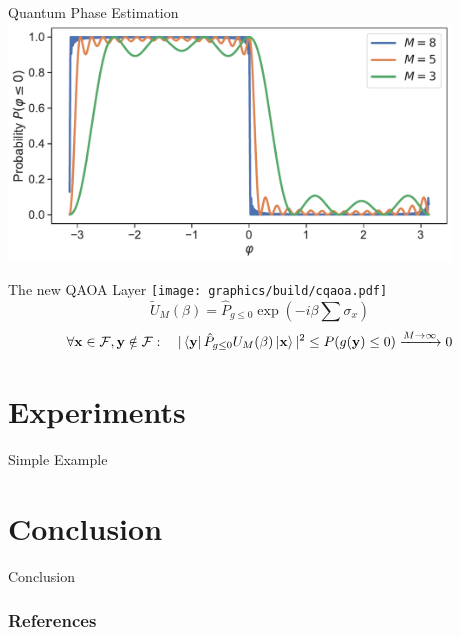\documentclass[aspectratio=169]{beamer}
\begin{document}
\begin{frame}{Quantum Phase Estimation}
    \centering
    \includegraphics[width=0.88\textwidth]{../plots/prob.pdf}
\end{frame}

\begin{frame}{The new QAOA Layer}
    \texttt{[image: graphics/build/cqaoa.pdf]}
    \[
        \tilde{U}_M(\beta) = \hat P_{g\leq0} \exp \left(-i\beta \sum \sigma_x\right) 
    \]
    \[
        \forall\mathbf{x} \in \mathcal{F}, \mathbf{y} \notin \mathcal{F}:\quad
        |\bra{\mathbf{y}}\hat P_{g \leq 0} U_M(\beta) \ket{\mathbf{x}}|^2 \leq
        P(g(\mathbf{y}) \leq 0) \xrightarrow{M\rightarrow
    \infty} 0
    \]
\end{frame}


\section{Experiments}

\begin{frame}{Simple Example}
\end{frame}

\section{Conclusion}

    \begin{frame}{Conclusion}
        
    \end{frame}

\begin{frame}[allowframebreaks]
    \frametitle{References}
    \printbibliography[heading=none]
\end{frame}
\end{document}
